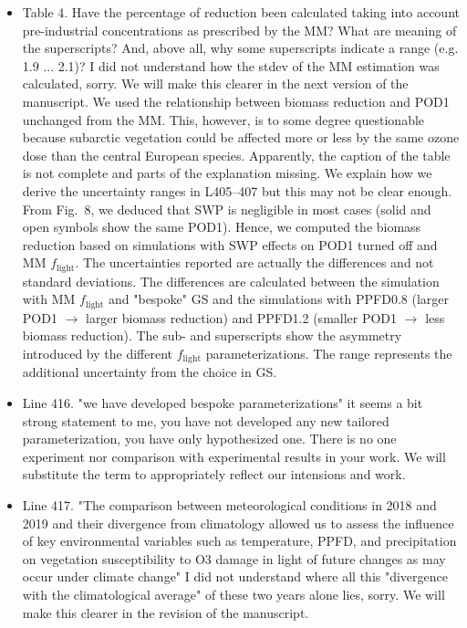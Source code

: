 \documentclass{scrartcl}
\begin{document}
\begin{itemize}
\item {\color{blue}Table 4. Have the percentage of reduction been calculated taking into account pre-industrial concentrations as prescribed by the MM?
What are meaning of the superscripts? And, above all, why some superscripts indicate a range (e.g. 1.9 ... 2.1)? I did not understand how the stdev of the MM estimation was calculated, sorry.}
We will make this clearer in the next version of the manuscript. We used the relationship between biomass reduction and POD1 unchanged from the MM. This, however, is to some degree questionable because subarctic vegetation could be affected more or less by the same ozone dose than the central European species. Apparently, the caption of the table is not complete and parts of the explanation missing. We explain how we derive the uncertainty ranges in L405--407 but this may not be clear enough. From Fig.~8, we deduced that SWP is negligible in most cases (solid and open symbols show the same POD1). Hence, we computed the biomass reduction based on simulations with SWP effects on POD1 turned off and MM $f_\mathrm{light}$. The uncertainties reported are actually the differences and not standard deviations. The differences are calculated between the simulation with MM $f_\mathrm{light}$ and "bespoke" GS and the simulations with PPFD0.8 (larger POD1 $\rightarrow$ larger biomass reduction) and PPFD1.2 (smaller POD1 $\rightarrow$ less biomass reduction). The sub- and superscripts show the asymmetry introduced by the different $f_\mathrm{light}$ parameterizations. The range represents the additional uncertainty from the choice in GS.

\item {\color{blue}Line 416. "we have developed bespoke parameterizations"
it seems a bit strong statement to me, you have not developed any new tailored
parameterization, you have only hypothesized one. There is no one experiment nor
comparison with experimental results in your work.}
We will substitute the term to appropriately reflect our intensions and work.

\item {\color{blue}Line 417. "The comparison between meteorological conditions in 2018 and 2019 and their divergence from climatology allowed us to assess the influence of key environmental variables such as temperature, PPFD, and precipitation on vegetation susceptibility to O3 damage in light of future changes as may occur under climate change" I did not understand where all this "divergence with the climatological average" of these two years alone lies, sorry.}
We will make this clearer in the revision of the manuscript.


\end{itemize}
\end{document}
